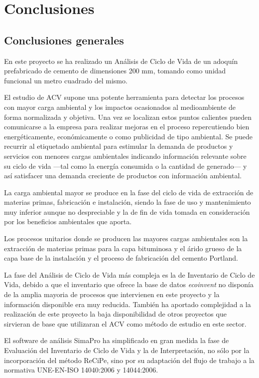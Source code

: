 \chapter{Conclusiones}\label{cap:conclusiones}
\section{Conclusiones generales}
En este proyecto se ha realizado un Análisis de Ciclo de Vida de un adoquín prefabricado de cemento de dimensiones 200 \si{mm}, tomando como unidad funcional un metro cuadrado del mismo.

El estudio de ACV supone una potente herramienta para detectar los procesos con mayor carga ambiental y los impactos ocasionados al medioambiente de forma normalizada y objetiva. Una vez se localizan estos puntos calientes pueden comunicarse a la empresa para realizar mejoras en el proceso repercutiendo bien energéticamente, económicamente o como publicidad de tipo ambiental. Se puede recurrir al etiquetado ambiental \cite{iso14020} para estimular la demanda de productos y servicios con menores cargas ambientales indicando información relevante sobre su ciclo de vida —tal como la energía consumida o la cantidad de  generado— y así satisfacer una demanda creciente de productos con información ambiental.

La carga ambiental mayor se produce en la fase del ciclo de vida de extracción de materias primas, fabricación e instalación, siendo la fase de uso y mantenimiento muy inferior aunque no despreciable y la de fin de vida tomada en consideración por los beneficios ambientales que aporta.

Los procesos unitarios donde se producen las mayores cargas ambientales son la extracción de materias primas para la capa bituminosa y el árido grueso de la capa base de la instalación y el proceso de fabricación del cemento Portland.

La fase del Análisis de Ciclo de Vida más compleja es la de Inventario de Ciclo de Vida, debido a que el inventario que ofrece la base de datos \textit{ecoinvent} no disponía de la amplia mayoria de procesos que intervienen en este proyecto y la información disponible era muy reducida. También ha aportado complejidad a la realización de este proyecto la baja disponibilidad de otros proyectos que sirvieran de base que utilizaran el ACV como método de estudio en este sector.

El software de análisis SimaPro ha simplificado en gran medida la fase de Evaluación del Inventario de Ciclo de Vida y la de Interpretación, no sólo por la incorporación del método ReCiPe, sino por su adaptación del flujo de trabajo a la normativa UNE-EN-ISO 14040:2006 y 14044:2006.


